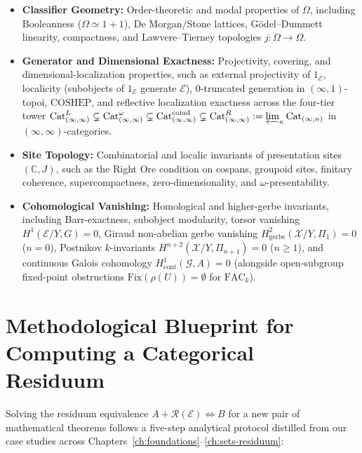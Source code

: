 \documentclass[10pt,twoside,openright]{book}
\theoremstyle{crmplain}
\theoremstyle{crmdef}
\theoremstyle{crmremark}
\begin{document}
\begin{itemize}[leftmargin=1.5em]

  \item \textbf{Classifier Geometry:} Order-theoretic and modal properties of $\Omega$, including Booleanness ($\Omega \simeq 1+1$), De Morgan/Stone lattices, Gödel--Dummett linearity, compactness, and Lawvere--Tierney topologies $j: \Omega \to \Omega$.

  \item \textbf{Generator and Dimensional Exactness:} Projectivity, covering, and dimensional-localization properties, such as external projectivity of $1_{\mathcal{E}}$, localicity (subobjects of $1_{\mathcal{E}}$ generate $\mathcal{E}$), $0$-truncated generation in $(\infty, 1)$-topoi, $\mathrm{COSHEP}$, and reflective localization exactness across the four-tier tower $\mathrm{Cat}^L_{(\infty, \infty)} \subsetneq \mathrm{Cat}^\omega_{(\infty, \infty)} \subsetneq \mathrm{Cat}^{\mathrm{coind}}_{(\infty, \infty)} \subsetneq \mathrm{Cat}^R_{(\infty, \infty)} := \varprojlim_\kappa \mathrm{Cat}_{(\infty, n)}$ in $(\infty, \infty)$-categories.

  \item \textbf{Site Topology:} Combinatorial and localic invariants of presentation sites $(\mathbb{C}, J)$, such as the Right Ore condition on cospans, groupoid sites, finitary coherence, supercompactness, zero-dimensionality, and $\omega$-presentability.

  \item \textbf{Cohomological Vanishing:} Homological and higher-gerbe invariants, including Barr-exactness, subobject modularity, torsor vanishing $H^1(\mathcal{E}/Y,\allowbreak G) = 0$, Giraud non-abelian gerbe vanishing $H^2_{\mathrm{gerbe}}(\mathcal{X}/Y,\allowbreak \Pi_1) = 0$ ($n = 0$), Postnikov $k$-invariants $H^{n+2}(\mathcal{X}/Y,\allowbreak \Pi_{n+1}) = 0$ ($n \ge 1$), and continuous Galois cohomology $H^1_{\mathrm{cont}}(\mathcal{G},\allowbreak A) = 0$ (alongside open-subgroup fixed-point obstructions $\mathrm{Fix}(\rho(U)) = \emptyset$ for $\mathrm{FAC}_k$).

\end{itemize}

\section{Methodological Blueprint for Computing a Categorical Residuum}

Solving the residuum equivalence $A + \mathcal{R}(\mathcal{E}) \iff B$ for a new pair of mathematical theorems follows a five-step analytical protocol distilled from our case studies across Chapters~\ref{ch:foundations}--\ref{ch:sets-residuum}:
\end{document}
